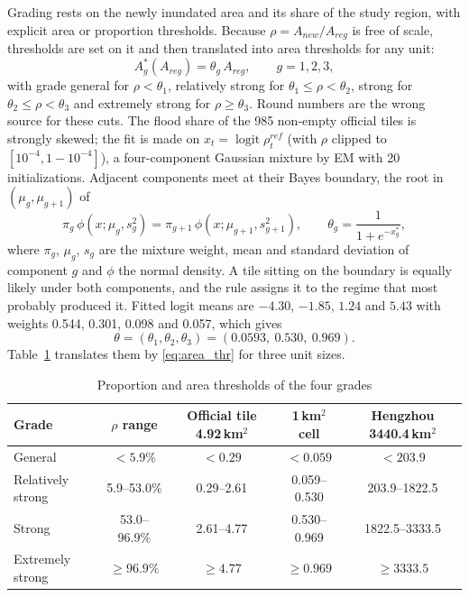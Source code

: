 Grading rests on the newly inundated area and its share of the study region, with explicit area or proportion thresholds. Because $\rho=A_{new}/A_{reg}$ is free of scale, thresholds are set on it and then translated into area thresholds for any unit:
\begin{equation}
A^*_g(A_{reg})=\theta_g\,A_{reg},\qquad g=1,2,3,
\label{eq:area_thr}
\end{equation}
with grade general for $\rho<\theta_1$, relatively strong for $\theta_1\le\rho<\theta_2$, strong for $\theta_2\le\rho<\theta_3$ and extremely strong for $\rho\ge\theta_3$. Round numbers are the wrong source for these cuts. The flood share of the 985 non-empty official tiles is strongly skewed; the fit is made on $x_t=\operatorname{logit}\rho^{ref}_t$ (with $\rho$ clipped to $[10^{-4},1-10^{-4}]$), a four-component Gaussian mixture by EM with 20 initializations. Adjacent components meet at their Bayes boundary, the root in $(\mu_g,\mu_{g+1})$ of
\begin{equation}
\pi_g\,\phi(x;\mu_g,s_g^2)=\pi_{g+1}\,\phi(x;\mu_{g+1},s_{g+1}^2),\qquad \theta_g=\frac{1}{1+e^{-x^*_g}},
\label{eq:gmm_bayes}
\end{equation}
where $\pi_g$, $\mu_g$, $s_g$ are the mixture weight, mean and standard deviation of component $g$ and $\phi$ the normal density. A tile sitting on the boundary is equally likely under both components, and the rule assigns it to the regime that most probably produced it. Fitted logit means are $-4.30$, $-1.85$, $1.24$ and $5.43$ with weights 0.544, 0.301, 0.098 and 0.057, which gives
\begin{equation}
\theta=(\theta_1,\theta_2,\theta_3)=(0.0593,\ 0.530,\ 0.969).
\label{eq:theta_values}
\end{equation}
Table~\ref{tab:grade_thr} translates them by \eqref{eq:area_thr} for three unit sizes.

\begin{table}[!ht]
\centering
\caption{Proportion and area thresholds of the four grades}
\label{tab:grade_thr}
\begin{tabular}{lcccc}
\toprule
Grade & $\rho$ range & Official tile 4.92\,km$^2$ & 1\,km$^2$ cell & Hengzhou 3440.4\,km$^2$ \\
\midrule
General & $<5.9\%$ & $<0.29$ & $<0.059$ & $<203.9$ \\
Relatively strong & 5.9--53.0\% & 0.29--2.61 & 0.059--0.530 & 203.9--1822.5 \\
Strong & 53.0--96.9\% & 2.61--4.77 & 0.530--0.969 & 1822.5--3333.5 \\
Extremely strong & $\ge96.9\%$ & $\ge4.77$ & $\ge0.969$ & $\ge3333.5$ \\
\bottomrule
\end{tabular}
\end{table}


